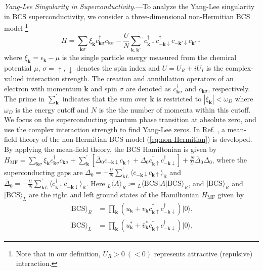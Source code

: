 \documentclass[aps,prl,twocolumn,nofootinbib,superscriptaddress,notitlepage,longbibliography]{revtex4-1}
\begin{document}
	\emph{Yang-Lee Singularity in Superconductivity}.---To analyze the Yang-Lee singularity in BCS superconductivity, we consider a three-dimensional non-Hermitian BCS model \cite{Yamamoto2019}\footnote{Note that in our definition, $U_{R}>0\:(<0)$ represents attractive (repulsive) interaction.} 
	\begin{equation}
	H=\sum_{\boldsymbol{k}\sigma}\xi_{\boldsymbol{k}}c_{\boldsymbol{k}\sigma}^{\dagger}c_{\boldsymbol{k}\sigma}-\frac{U}{N}\sum_{\bm{k},\bm{k}'}{}^{'}c_{\bm{k}\uparrow}^{\dagger}c_{\bm{-k}\downarrow}^{\dagger}c_{\bm{-k}'\downarrow}c_{\bm{k}'\uparrow}\label{eq:non-Hermitian}
	\end{equation}
	where $\xi_{\boldsymbol{k}}=\epsilon_{\bm{k}}-\mu$ is the single particle energy measured from the chemical potential $\mu$, $\sigma=\uparrow,\downarrow$ denotes the spin index and $U=U_R+iU_I$ is the complex-valued interaction  strength. The creation and annihilation operators of an electron with momentum $\bm{k}$ and spin $\sigma$ are denoted as $c_{\bm{k}\sigma}^\dag$ and $c_{\bm{k}\sigma}$, respectively. The prime in $\sum_{\bm{k}}^{'}$ indicates that the sum over $\bm{k}$ is restricted to  $|\xi_{\boldsymbol{k}}|<\omega_D$ where $\omega_D$ is the energy cutoff and $N$ is the the number of momenta within this cutoff. We focus on the superconducting quantum phase transition at absolute zero, and use the complex interaction strength to find Yang-Lee zeros. In Ref. \cite{Yamamoto2019}, a mean-field theory of the non-Hermitian BCS model (\ref{eq:non-Hermitian}) is developed. %
	By applying the mean-field theory, the BCS Hamiltonian is given by $H_{\mathrm{MF}}=\sum_{\boldsymbol{k}\sigma}\xi_{\boldsymbol{k}}c_{\boldsymbol{k}\sigma}^{\dagger}c_{\boldsymbol{k}\sigma}+\sum_{\bm{k}}^{'}[\bar{\Delta}_0c_{-\bm{k}\downarrow}c_{\bm{k}\uparrow}+\Delta_0 c_{\bm{k}\uparrow}^{\dagger}c_{-\bm{k}\downarrow}^{\dagger}]+\frac{N}{U}\bar{\Delta}_0\Delta_0$, where the superconducting gaps are $\Delta_{0}=-\frac{U}{N}\sum_{\boldsymbol{k}L}^{'}\langle c_{-\boldsymbol{k}\downarrow}c_{\boldsymbol{k}\uparrow}\rangle_{\mathrm{R}}$ and $\bar{\Delta}_{0}=-\frac{U}{N}\sum_{\boldsymbol{k}L}^{'}\langle c_{\boldsymbol{k}\uparrow}^{\dagger}c_{-\boldsymbol{k}\downarrow}^{\dagger}\rangle_{\mathrm{R}}$. Here ${}_L\langle A\rangle_{R}:={}_L\langle \text{BCS}|A|\text{BCS}\rangle_R$, and $|\text{BCS}\rangle_{R}$ and $|\text{BCS}\rangle_{L}$ are the right and left ground states of the Hamiltonian $H_{\mathrm{MF}}$ given by \cite{Yamamoto2019}
	\begin{align}
		|\text{BCS}\rangle_{R}&=\prod_{\bm{k}}(u_{\bm{k}}+v_{\bm{k}}c_{\boldsymbol{k}\uparrow}^{\dagger}c_{-\boldsymbol{k}\downarrow}^{\dagger})|0\rangle,\\
		|\text{BCS}\rangle_{L}&=\prod_{\bm{k}}(u^{*}_{\bm{k}}+\bar{v}^{*}_{\bm{k}}c_{\boldsymbol{k}\uparrow}^{\dagger}c_{-\boldsymbol{k}\downarrow}^{\dagger})|0\rangle,
	\end{align}
\end{document}
